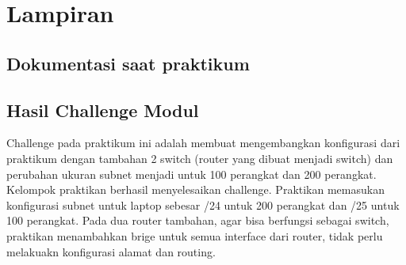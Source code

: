 \section{Lampiran}
\subsection{Dokumentasi saat praktikum}


\subsection{Hasil Challenge Modul}
Challenge pada praktikum ini adalah membuat mengembangkan konfigurasi dari praktikum dengan tambahan 2 switch (router yang dibuat menjadi switch) dan perubahan ukuran subnet menjadi untuk 100 perangkat dan 200 perangkat. \\
Kelompok praktikan berhasil menyelesaikan challenge. Praktikan memasukan konfigurasi subnet untuk laptop sebesar /24 untuk 200 perangkat dan /25 untuk 100 perangkat. Pada dua router tambahan, agar bisa berfungsi sebagai switch, praktikan menambahkan brige untuk semua interface dari router, tidak perlu melakuakn konfigurasi alamat dan routing.


